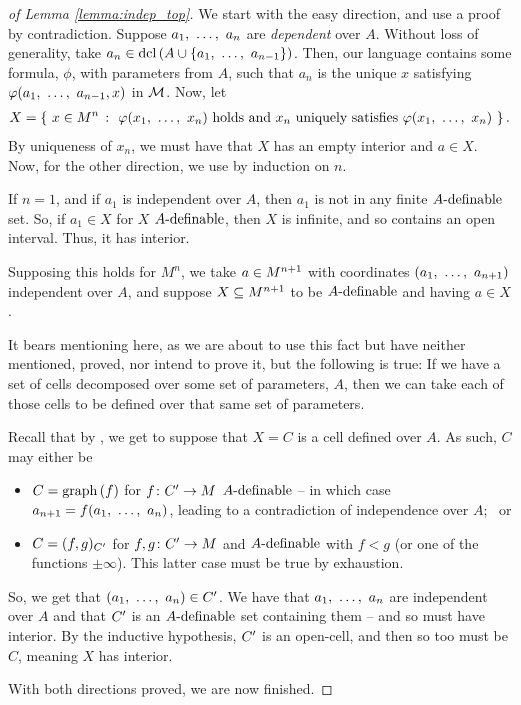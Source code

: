 \begin{proof}[of Lemma \ref{lemma:indep_top}]
  We start with the easy direction, and use a proof by contradiction. Suppose $\vonevm{a}{n}$ are \emph{dependent} over $A$. Without loss of generality, take $a_n \in \dcl{A \cup \{ \vonevm{a}{n-1} \}}$. Then, our language contains some formula, $\phi$, with parameters from $A$, such that $a_n$ is the unique $x$ satisfying $\phi(\vonevm{a}{n-1}, x)$ in $\M$. Now, let
    \begin{align*}
      X = \left\{ \ \aMn[x]{n} \ \colon \ \phi(\vonevm{x}{n}) \textrm{ holds and } x_n \textrm{ uniquely satisfies } \phi(\vonevm{x}{n}) \ \right\}.
    \end{align*}
  By uniqueness of $x_n$, we must have that $X$ has an empty interior and $a \in X$. Now, for the other direction, we use \cd by induction on $n$.

  If $n = 1$, and if $a_1$ is independent over $A$, then $a_1$ is not in any finite $\Adefnb$ set. So, if $a_1 \in X$ for $X$ $\Adefnb$, then $X$ is infinite, and so contains an open interval. Thus, it has \inhb interior.

\pagebreak 

  Supposing this holds for $M^n$, we take $\aMn[a]{n+1}$ with coordinates $(\vonevm{a}{n+1})$ independent over $A$, and suppose $\XMn[X]{n+1}$ to be $\Adefnb$ and having $a \in X$.
  \begin{svgraybox}
    It bears mentioning here, as we are about to use this fact but have neither mentioned, proved, nor intend to prove it, but the following is true: If we have a set of cells decomposed over some set of parameters, $A$, then we can take each of those cells to be defined over that same set of parameters.
  \end{svgraybox}
  Recall that by \cd, we get to suppose that $X = C$ is a cell defined over $A$. As such, $C$ may either be
    \begin{itemize}
      \item $C = \graph{f}$ for $\funcdom{f}{\pri{C}}{M}$ $\Adefnb$ -- in which case $a_{n+1} = f(\vonevm{a}{n})$, leading to a contradiction of independence over $A$; \ or

      \item $C = (f, g)_{\pri{C}}$ for $\funcdom{f,g}{\pri{C}}{M}$ \cont and $\Adefnb$ with $f < g$ (or one of the functions $\pm \infty$). This latter case must be true by exhaustion.
    \end{itemize}
  So, we get that $(\vonevm{a}{n}) \in \pri{C}$. We have that $\vonevm{a}{n}$ are independent over $A$ and that $\pri{C}$ is an $\Adefnb$ set containing them -- and so must have interior. By the inductive hypothesis, $\pri{C}$ is an open-cell, and then so too must be $C$, meaning $X$ has \inhb interior.

  With both directions proved, we are now finished.
  \smartqed
\end{proof}

